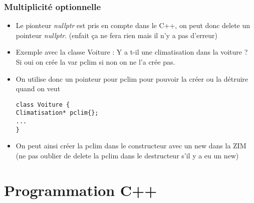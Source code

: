 \documentclass[12pt,a4paper]{article}
\begin{document}
\subsubsection{Multiplicité optionnelle}
\begin{itemize}
\item Le pionteur \textit{nullptr} est pris en compte dans le C++, on peut donc delete un pointeur \textit{nullptr}. (enfait ça ne fera rien mais il n'y a pas d'erreur)
\item Exemple avec la classe Voiture : Y a t-il une climatisation dans la voiture ?\\
Si oui on crée la var pclim si non on ne l'a crée pas.
\item On utilise donc un pointeur pour pclim pour pouvoir la créer ou la détruire quand on veut
\begin{lstlisting}
class Voiture {
Climatisation* pclim{};
...
}
\end{lstlisting}
\item On peut ainsi créer la pclim dans le constructeur avec un new dans la ZIM (ne pas oublier de delete la pclim dans le destructeur s'il y a eu un new)
\end{itemize}





\newpage
\section{Programmation C++}
\end{document}

